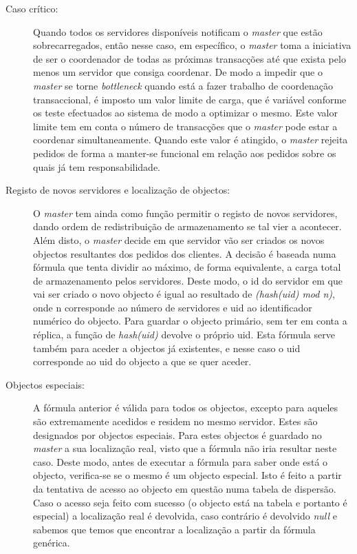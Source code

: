 \begin{description}
\item[Caso crítico:]
Quando todos os servidores disponíveis notificam o \textit{master} que estão sobrecarregados, então nesse caso, em específico, o \textit{master} toma a iniciativa de ser o coordenador de todas as próximas transacções até que exista pelo menos um servidor que consiga coordenar. De modo a impedir que o \textit{master} se torne \textit{bottleneck} quando está a fazer trabalho de coordenação transaccional, é imposto um valor limite de carga, que é variável conforme os teste efectuados ao sistema de modo a optimizar o mesmo. Este valor limite tem em conta o número de transacções que o \textit{master} pode estar a coordenar simultaneamente. Quando este valor é atingido, o \textit{master} rejeita pedidos de forma a manter-se funcional em relação aos pedidos sobre os quais já tem responsabilidade. 

\item[Registo de novos servidores e localização de objectos:]
O \textit{master} tem ainda como função permitir o registo de novos servidores, dando ordem de redistribuição de armazenamento se tal vier a acontecer. Além disto, o \textit{master} decide em que servidor vão ser criados os novos objectos resultantes dos pedidos dos clientes. A decisão é baseada numa fórmula que tenta dividir ao máximo, de forma equivalente, a carga total de armazenamento pelos servidores. Deste modo, o id do servidor em que vai ser criado o novo objecto é igual ao resultado de \textit{(hash(uid) mod n)}, onde n corresponde ao número de servidores e uid ao identificador numérico do objecto. Para guardar o objecto primário, sem ter em conta a réplica, a função de \textit{hash(uid)} devolve o próprio uid. Esta fórmula serve também para aceder a objectos já existentes, e nesse caso o uid corresponde ao uid do objecto a que se quer aceder.

\item[Objectos especiais:]
A fórmula anterior é válida para todos os objectos, excepto para aqueles são extremamente acedidos e residem no mesmo servidor. Estes são designados por objectos especiais. Para estes objectos é guardado no \textit{master} a sua localização real, visto que a fórmula não iria resultar neste caso. Deste modo, antes de executar a fórmula para saber onde está o objecto, verifica-se se o mesmo é um objecto especial. Isto é feito a partir da tentativa de acesso ao objecto em questão numa tabela de dispersão. Caso o acesso seja feito com sucesso (o objecto está na tabela e portanto é especial) a localização real é devolvida, caso contrário é devolvido \textit{null} e sabemos que temos que encontrar a localização a partir da fórmula genérica.


\end{description}
